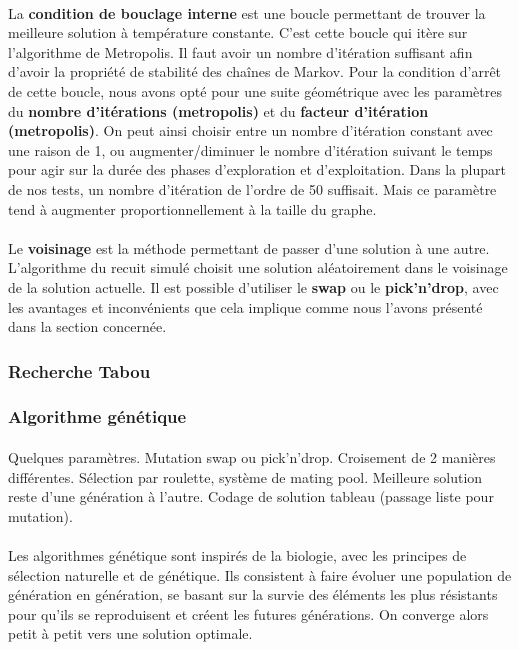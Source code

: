 \documentclass[12pt]{article}
\begin{document}
\paragraph{}La \textbf{condition de bouclage interne} est une boucle permettant de trouver la meilleure solution à température constante. C'est cette boucle qui itère sur l'algorithme de Metropolis. Il faut avoir un nombre d'itération suffisant afin d'avoir la propriété de stabilité des chaînes de Markov. Pour la condition d'arrêt de cette boucle, nous avons opté pour une suite géométrique avec les paramètres du \textbf{nombre d'itérations (metropolis)} et du \textbf{facteur d'itération (metropolis)}. On peut ainsi choisir entre un nombre  d'itération constant avec une raison de 1, ou augmenter/diminuer le nombre d'itération suivant le temps pour agir sur la durée des phases d'exploration et d'exploitation. Dans la plupart de nos tests, un nombre d'itération de l'ordre de 50 suffisait. Mais ce paramètre tend à augmenter proportionnellement à la taille du graphe.

\paragraph{}Le \textbf{voisinage} est la méthode permettant de passer d'une solution à une autre. L'algorithme du recuit simulé choisit une solution aléatoirement dans le voisinage de la solution actuelle. Il est possible d'utiliser le \textbf{swap} ou le \textbf{pick'n'drop}, avec les avantages et inconvénients que cela implique comme nous l'avons présenté dans la section concernée.

\subsubsection{Recherche Tabou}

\subsubsection{Algorithme génétique}

\paragraph{}Quelques paramètres. Mutation swap ou pick'n'drop. Croisement de 2 manières différentes. Sélection par roulette, système de mating pool. Meilleure solution reste d'une génération à l'autre. Codage de solution tableau (passage liste pour mutation).

\paragraph{}Les algorithmes génétique sont inspirés de la biologie, avec les principes de sélection naturelle et de génétique. Ils consistent à faire évoluer une population de génération en génération, se basant sur la survie des éléments les plus résistants pour qu'ils se reproduisent et créent les futures générations. On converge alors petit à petit vers une solution optimale.
\end{document}
